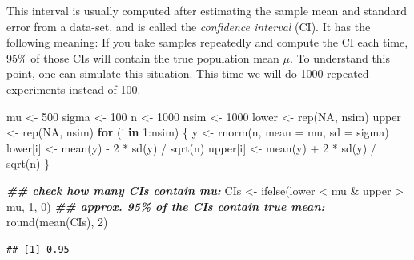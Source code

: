 \documentclass[
  12pt,
]{krantz}
\newenvironment{Shaded}{\begin{snugshade}}{\end{snugshade}}
\newcommand{\AttributeTok}[1]{\textcolor[rgb]{0.77,0.63,0.00}{#1}}
\newcommand{\ConstantTok}[1]{\textcolor[rgb]{0.00,0.00,0.00}{#1}}
\newcommand{\ControlFlowTok}[1]{\textcolor[rgb]{0.13,0.29,0.53}{\textbf{#1}}}
\newcommand{\DecValTok}[1]{\textcolor[rgb]{0.00,0.00,0.81}{#1}}
\newcommand{\DocumentationTok}[1]{\textcolor[rgb]{0.56,0.35,0.01}{\textbf{\textit{#1}}}}
\newcommand{\FunctionTok}[1]{\textcolor[rgb]{0.00,0.00,0.00}{#1}}
\newcommand{\NormalTok}[1]{#1}
\newcommand{\OtherTok}[1]{\textcolor[rgb]{0.56,0.35,0.01}{#1}}
\newcommand{\SpecialCharTok}[1]{\textcolor[rgb]{0.00,0.00,0.00}{#1}}
\theoremstyle{definition}
\theoremstyle{definition}
\theoremstyle{definition}
\theoremstyle{definition}
\theoremstyle{remark}
\begin{document}
This interval is usually computed after estimating the sample mean and standard error from a data-set, and is called the \emph{confidence interval} (CI). It has the following meaning: If you take samples repeatedly and compute the CI each time, 95\% of those CIs will contain the true population mean \(\mu\). To understand this point, one can simulate this situation. This time we will do 1000 repeated experiments instead of 100.

\begin{Shaded}
\begin{Highlighting}[]
\NormalTok{mu }\OtherTok{\textless{}{-}} \DecValTok{500}
\NormalTok{sigma }\OtherTok{\textless{}{-}} \DecValTok{100}
\NormalTok{n }\OtherTok{\textless{}{-}} \DecValTok{1000}
\NormalTok{nsim }\OtherTok{\textless{}{-}} \DecValTok{1000}
\NormalTok{lower }\OtherTok{\textless{}{-}} \FunctionTok{rep}\NormalTok{(}\ConstantTok{NA}\NormalTok{, nsim)}
\NormalTok{upper }\OtherTok{\textless{}{-}} \FunctionTok{rep}\NormalTok{(}\ConstantTok{NA}\NormalTok{, nsim)}
\ControlFlowTok{for}\NormalTok{ (i }\ControlFlowTok{in} \DecValTok{1}\SpecialCharTok{:}\NormalTok{nsim) \{}
\NormalTok{  y }\OtherTok{\textless{}{-}} \FunctionTok{rnorm}\NormalTok{(n, }\AttributeTok{mean =}\NormalTok{ mu, }\AttributeTok{sd =}\NormalTok{ sigma)}
\NormalTok{  lower[i] }\OtherTok{\textless{}{-}} \FunctionTok{mean}\NormalTok{(y) }\SpecialCharTok{{-}} \DecValTok{2} \SpecialCharTok{*} \FunctionTok{sd}\NormalTok{(y) }\SpecialCharTok{/} \FunctionTok{sqrt}\NormalTok{(n)}
\NormalTok{  upper[i] }\OtherTok{\textless{}{-}} \FunctionTok{mean}\NormalTok{(y) }\SpecialCharTok{+} \DecValTok{2} \SpecialCharTok{*} \FunctionTok{sd}\NormalTok{(y) }\SpecialCharTok{/} \FunctionTok{sqrt}\NormalTok{(n)}
\NormalTok{\}}

\DocumentationTok{\#\# check how many CIs contain mu:}
\NormalTok{CIs }\OtherTok{\textless{}{-}} \FunctionTok{ifelse}\NormalTok{(lower }\SpecialCharTok{\textless{}}\NormalTok{ mu }\SpecialCharTok{\&}\NormalTok{ upper }\SpecialCharTok{\textgreater{}}\NormalTok{ mu, }\DecValTok{1}\NormalTok{, }\DecValTok{0}\NormalTok{)}
\DocumentationTok{\#\# approx. 95\% of the CIs contain true mean:}
\FunctionTok{round}\NormalTok{(}\FunctionTok{mean}\NormalTok{(CIs), }\DecValTok{2}\NormalTok{)}
\end{Highlighting}
\end{Shaded}

\begin{verbatim}
## [1] 0.95
\end{verbatim}
\end{document}
